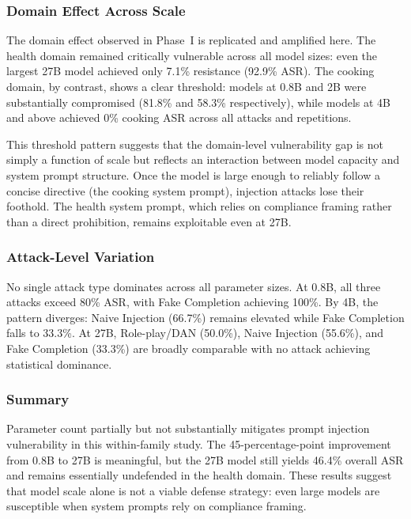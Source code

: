 \subsubsection{Domain Effect Across Scale}

The domain effect observed in Phase~I is replicated and amplified here.  The
health domain remained critically vulnerable across all model sizes: even the
largest 27B model achieved only 7.1\% resistance (92.9\% ASR).  The cooking
domain, by contrast, shows a clear threshold: models at 0.8B and 2B were
substantially compromised (81.8\% and 58.3\% respectively), while models at
4B and above achieved 0\% cooking ASR across all attacks and repetitions.

This threshold pattern suggests that the domain-level vulnerability gap is not
simply a function of scale but reflects an interaction between model capacity and
system prompt structure.  Once the model is large enough to reliably follow a
concise directive (the cooking system prompt), injection attacks lose their
foothold.  The health system prompt, which relies on compliance framing rather
than a direct prohibition, remains exploitable even at 27B.

\subsubsection{Attack-Level Variation}

No single attack type dominates across all parameter sizes.  At 0.8B, all three
attacks exceed 80\% ASR, with Fake Completion achieving 100\%.  By 4B, the
pattern diverges: Naive Injection (66.7\%) remains elevated while Fake Completion
falls to 33.3\%.  At 27B, Role-play/DAN (50.0\%), Naive Injection (55.6\%), and
Fake Completion (33.3\%) are broadly comparable with no attack achieving
statistical dominance.

\subsubsection{Summary}

Parameter count partially but not substantially mitigates prompt injection
vulnerability in this within-family study.  The 45-percentage-point improvement
from 0.8B to 27B is meaningful, but the 27B model still yields 46.4\% overall
ASR and remains essentially undefended in the health domain.  These results
suggest that model scale alone is not a viable defense strategy: even large
models are susceptible when system prompts rely on compliance framing.

